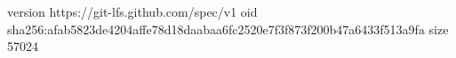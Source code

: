 version https://git-lfs.github.com/spec/v1
oid sha256:afab5823de4204affe78d18daabaa6fc2520e7f3f873f200b47a6433f513a9fa
size 57024
